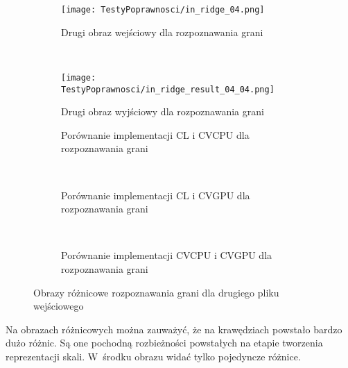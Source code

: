 \begin{figure}[h]

\begin{center}
\begin{subfigure}[t]{0.3\textwidth}
\texttt{[image: TestyPoprawnosci/in\_ridge\_04.png]}
\caption{Drugi obraz wejściowy dla rozpoznawania grani}
\label{fig:valRidge04}
\end{subfigure}
~
\begin{subfigure}[t]{0.3\textwidth}
\texttt{[image: TestyPoprawnosci/in\_ridge\_result\_04\_04.png]}
\caption{Drugi obraz wyjściowy dla rozpoznawania grani}
\label{fig:valRidgeResult04}
\end{subfigure}
\end{center}

\begin{subfigure}[t]{0.3\textwidth}
	\centering
	\setlength\fboxsep{0pt}
	\setlength\fboxrule{0.5pt}
	\caption{Porównanie implementacji CL i CVCPU dla rozpoznawania grani}
	\label{fig:valRidge4CLCVCPU}
\end{subfigure}
~
\begin{subfigure}[t]{0.3\textwidth}
	\centering
	\setlength\fboxsep{0pt}
	\setlength\fboxrule{0.5pt}
	\caption{Porównanie implementacji CL i CVGPU dla rozpoznawania grani}
	\label{fig:valRidge4CLCVGPU}
\end{subfigure}
~
\begin{subfigure}[t]{0.3\textwidth}
	\centering
	\setlength\fboxsep{0pt}
	\setlength\fboxrule{0.5pt}
	\caption{Porównanie implementacji CVCPU i CVGPU dla rozpoznawania grani}
	\label{fig:valRidge4CVCPUCVGPU}                 
\end{subfigure}
\caption{Obrazy różnicowe rozpoznawania grani dla drugiego pliku wejściowego}

\label{fig:valRidge4}
\end{figure}

Na obrazach różnicowych można zauważyć, że na krawędziach powstało bardzo dużo różnic. Są one pochodną rozbieżności powstałych na etapie tworzenia reprezentacji skali. W~środku obrazu widać tylko pojedyncze różnice. 
